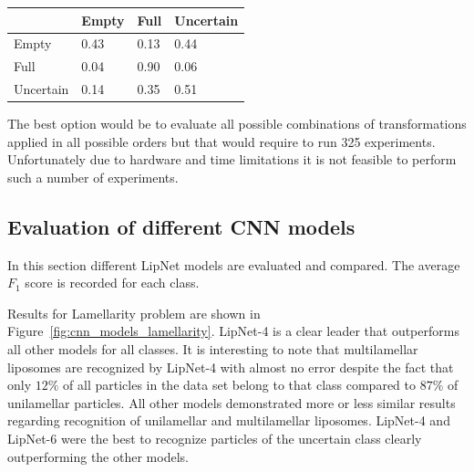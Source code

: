 \documentclass[a4paper, 11pt, table]{article}
\begin{document}
\begin{center}
\label{table:zoom_only}
\begin{tabular}{|L{2.5cm} |C{2.5cm} |C{2.5cm} |C{2.5cm}|}
\toprule
 & Empty & Full & Uncertain \\
\midrule
Empty & 0.43 & 0.13 & 0.44 \\
Full & 0.04 & 0.90 & 0.06 \\
Uncertain & 0.14 & 0.35 & 0.51 \\
\bottomrule
\end{tabular}
\end{center}

The best option would be to evaluate all possible combinations of transformations applied in all possible orders but that would require to run 325 experiments. Unfortunately due to hardware and time limitations it is not feasible to perform such a number of experiments.

\subsection{Evaluation of different CNN models}

In this section different LipNet models are evaluated and compared. The average $F_1$ score is recorded for each class.

Results for Lamellarity problem are shown in Figure~\ref{fig:cnn_models_lamellarity}. LipNet-4 is a clear leader that outperforms all other models for all classes. It is interesting to note that multilamellar liposomes are recognized by LipNet-4 with almost no error despite the fact that only $12\%$ of all particles in the data set belong to that class compared to $87\%$ of unilamellar particles. All other models demonstrated more or less similar results regarding recognition of unilamellar and multilamellar liposomes. LipNet-4 and LipNet-6 were the best to recognize particles of the uncertain class clearly outperforming the other models.
\end{document}
